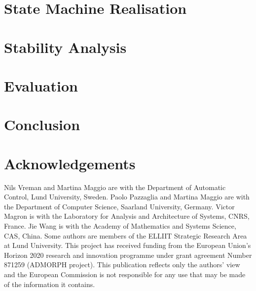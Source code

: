 \section{State Machine Realisation}
\label{sec:state-machine}


\section{Stability Analysis}
\label{sec:stability}


\section{Evaluation}
\label{sec:evaluation}


\section{Conclusion}
\label{sec:conclusion}


\section*{Acknowledgements}
Nils Vreman and Martina Maggio are with the Department of Automatic Control, Lund University, Sweden.
Paolo Pazzaglia and Martina Maggio are with the Department of Computer Science, Saarland University, Germany.
Victor Magron is with the Laboratory for Analysis and Architecture of Systems, CNRS, France.
Jie Wang is with the Academy of Mathematics and Systems Science, CAS, China.
Some authors are members of the ELLIIT Strategic Research Area at Lund University.
This project has received funding from the European Union's Horizon 2020 research and innovation programme under grant agreement Number 871259 (ADMORPH project).
This publication reflects only the authors' view and the European Commission is not responsible for any use that may be made of the information it contains.



\printbibliography[heading=subbibliography]
